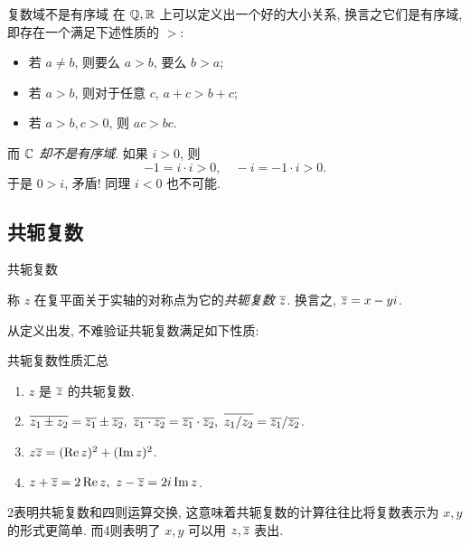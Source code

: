 \begin{frame}{复数域不是有序域\noexer}
	\onslide<+->
	在 ${\mathbb{Q}},{\mathbb{R}}$ 上可以定义出一个好的大小关系,
	\onslide<+->
	换言之它们是有序域, 即存在一个满足下述性质的 $>$:
	\begin{itemize}
		\item 若 $a\neq b$, 则要么 $a>b$, 要么 $b>a$;
		\item 若 $a>b$, 则对于任意 $c$, $a+c>b+c$;
		\item 若 $a>b,c>0$, 则 $ac>bc$.
	\end{itemize}
	\onslide<+->
	而 \emph{${\mathbb{C}}$ 却不是有序域}.
	\onslide<+->
	如果 $i>0$, 则
		\[-1=i\cdot i>0,\quad -i=-1\cdot i>0.\]
	\onslide<+->
	于是 $0>i$, 矛盾! 同理 $i<0$ 也不可能.
\end{frame}


\subsection{共轭复数}

\begin{frame}{共轭复数}
	\onslide<+->
	\begin{definition}
		称 $z$ 在复平面关于实轴的对称点为它的\emph{共轭复数 $\overline z$}.
	换言之, $\overline z=x-yi$.
	\end{definition}

	\onslide<+->
	从定义出发, 不难验证共轭复数满足如下性质:

	\onslide<+->
	\begin{block}{共轭复数性质汇总}
		\begin{enumerate}
			\item $z$ 是 $\overline z$ 的共轭复数.
			\item $\ov{z_1\pm z_2}=\ov{z_1}\pm\ov{z_2},\ 
			\ov{z_1\cdot z_2}=\ov{z_1}\cdot\ov{z_2},\ 
			\ov{z_1/z_2}=\ov{z_1}/\ov{z_2}$.
			\item $z\overline{z}=(\operatorname{Re} z)^2+(\operatorname{Im} z)^2$.
			\item $z+\overline z=2\operatorname{Re} z,\ z-\overline z=2i\operatorname{Im} z$.
		\end{enumerate}
	\end{block}
	\onslide<+->
	\enumnum2表明共轭复数和四则运算交换, 这意味着共轭复数的计算往往比将复数表示为 $x,y$ 的形式更简单.
	\onslide<+->
	而\enumnum4则表明了 $x,y$ 可以用 $z,\overline z$ 表出.
\end{frame}

